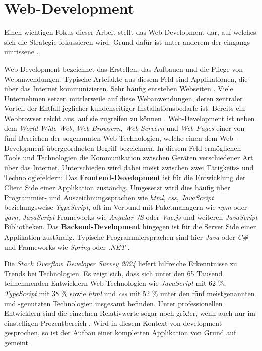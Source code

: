 \section{Web-Development}
\label{sec:02-01_web-development}

Einen wichtigen Fokus dieser Arbeit stellt das Web-Development dar, auf welches sich die  Strategie fokussieren wird. Grund dafür ist unter anderem der eingangs umrissene .

Web-Development bezeichnet das Erstellen, das Aufbauen und die Pflege von Webanwendungen. Typische Artefakte aus diesem Feld sind Applikationen, die über das Internet kommunizieren. Sehr häufig entstehen Webseiten \cite{209:Web-Development}. Viele Unternehmen setzen mittlerweile auf diese Webanwendungen, deren zentraler Vorteil der Entfall jeglicher kundenseitiger Installationsbedarfe ist. Bereits ein Webbrowser reicht aus, auf sie zugreifen zu können \cite{002:Optimizing-Cloud-Applications-with-DevOps}. Web-Development ist neben dem \textit{World Wide Web}, \textit{Web Browsern}, \textit{Web Servern} und \textit{Web Pages} einer von fünf Bereichen der sogenannten Web-Technologien, welche einen dem Web-Development übergeordneten Begriff bezeichnen. In diesem Feld ermöglichen Tools und Technologien die Kommunikation zwischen Geräten verschiedener Art über das Internet. Unterschieden wird dabei meist zwischen zwei Tätigkeits- und Technologiefeldern: Das \textbf{Frontend-Development} ist für die Entwicklung der Client Side einer Applikation zuständig. Umgesetzt wird dies häufig über Programmier- und Auszeichnungssprachen wie \textit{\Gls{html}}, \textit{\Gls{css}}, \textit{JavaScript} beziehungsweise \textit{TypeScript}, oft im Verbund mit Paketmanagern wie \textit{npm} oder \textit{yarn}, \textit{JavaScript} Frameworks wie \textit{Angular JS} oder \textit{Vue.js} und weiteren \textit{JavaScript} Bibliotheken. Das \textbf{Backend-Development} hingegen ist für die Server Side einer Applikation zuständig. Typische Programmiersprachen sind hier \textit{Java} oder \textit{C\#} und Frameworks wie \textit{Spring} oder \textit{.NET} \cite{208:Web-Technology}.

Die \textit{Stack Overflow Developer Survey 2024} liefert hilfreiche Erkenntnisse zu Trends bei Technologien. Es zeigt sich, dass sich unter den 65 Tausend teilnehmenden Entwicklern Web-Technologien wie \textit{JavaScript} mit 62 \%, \textit{TypeScript} mit 38 \% sowie \textit{\Gls{html}} und \textit{\Gls{css}} mit 52 \% unter den fünf meistgenannten und -genutzten Technologien insgesamt befinden. Unter professionellen Entwicklern sind die einzelnen Relativwerte sogar noch größer, wenn auch nur im einstelligen Prozentbereich \cite{206:Developer-Survey-2024}. Wird in diesem Kontext von \Gls{development} gesprochen, so ist der Aufbau einer kompletten Applikation von Grund auf gemeint.

